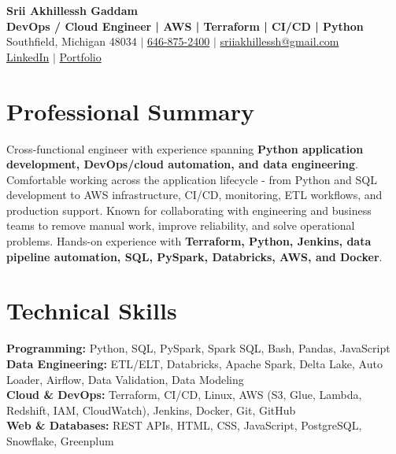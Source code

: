 \documentclass[letterpaper,10pt]{article}
\begin{document}
\fontsize{9.35pt}{10.45pt}\selectfont

\begin{center}
    {\LARGE \textbf{Srii Akhillessh Gaddam}} \\[-1pt]
    \textbf{DevOps / Cloud Engineer | AWS | Terraform | CI/CD | Python} \\[2pt]
    Southfield, Michigan 48034 $|$
    \href{tel:6468752400}{646-875-2400} $|$
    \href{mailto:sriiakhillessh@gmail.com}{sriiakhillessh@gmail.com} \\[1pt]
    \href{https://www.linkedin.com/in/srii-akhiilessh-gaddam-b48668191/}{LinkedIn} $|$
    \href{https://sriiakhillesshg.github.io/portfolio/}{Portfolio}
\end{center}
\vspace{-8pt}

\section{Professional Summary}
\small{Cross-functional engineer with experience spanning \textbf{Python application development, DevOps/cloud automation, and data engineering}. Comfortable working across the application lifecycle - from Python and SQL development to AWS infrastructure, CI/CD, monitoring, ETL workflows, and production support. Known for collaborating with engineering and business teams to remove manual work, improve reliability, and solve operational problems. Hands-on experience with \textbf{Terraform, Python, Jenkins, data pipeline automation, SQL, PySpark, Databricks, AWS, and Docker}.}

\section{Technical Skills}
\small{
\textbf{Programming:} Python, SQL, PySpark, Spark SQL, Bash, Pandas, JavaScript \\
\textbf{Data Engineering:} ETL/ELT, Databricks, Apache Spark, Delta Lake, Auto Loader, Airflow, Data Validation, Data Modeling \\
\textbf{Cloud \& DevOps:} Terraform, CI/CD, Linux, AWS (S3, Glue, Lambda, Redshift, IAM, CloudWatch), Jenkins, Docker, Git, GitHub \\
\textbf{Web \& Databases:} REST APIs, HTML, CSS, JavaScript, PostgreSQL, Snowflake, Greenplum
}
\end{document}
